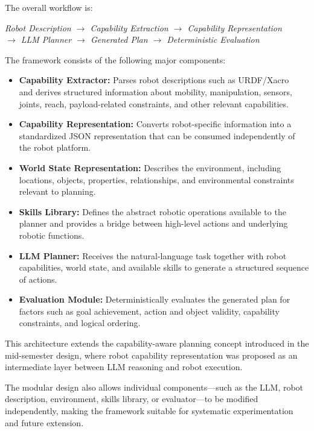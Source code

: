 \documentclass[12pt,a4paper]{article}
\begin{document}
The overall workflow is:

\begin{center}
\textit{Robot Description $\rightarrow$ Capability Extraction $\rightarrow$ Capability Representation}\\[4pt]
\textit{$\rightarrow$ LLM Planner $\rightarrow$ Generated Plan $\rightarrow$ Deterministic Evaluation}
\end{center}

The framework consists of the following major components:

\begin{itemize}
  \item \textbf{Capability Extractor:} Parses robot descriptions such as URDF/Xacro~\cite{urdf} and derives structured information about mobility, manipulation, sensors, joints, reach, payload-related constraints, and other relevant capabilities.
  \item \textbf{Capability Representation:} Converts robot-specific information into a standardized JSON representation that can be consumed independently of the robot platform.
  \item \textbf{World State Representation:} Describes the environment, including locations, objects, properties, relationships, and environmental constraints relevant to planning.
  \item \textbf{Skills Library:} Defines the abstract robotic operations available to the planner and provides a bridge between high-level actions and underlying robotic functions.
  \item \textbf{LLM Planner:} Receives the natural-language task together with robot capabilities, world state, and available skills to generate a structured sequence of actions.
  \item \textbf{Evaluation Module:} Deterministically evaluates the generated plan for factors such as goal achievement, action and object validity, capability constraints, and logical ordering.
\end{itemize}

This architecture extends the capability-aware planning concept introduced in the mid-semester design, where robot capability representation was proposed as an intermediate layer between LLM reasoning and robot execution.

The modular design also allows individual components---such as the LLM, robot description, environment, skills library, or evaluator---to be modified independently, making the framework suitable for systematic experimentation and future extension.
\end{document}
